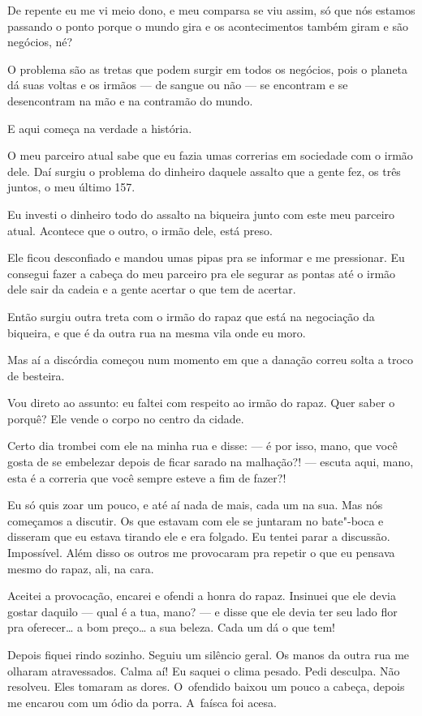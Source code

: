 De repente eu me vi meio dono, e meu comparsa se viu assim, só que nós
estamos passando o ponto porque o mundo gira e os acontecimentos também
giram e são negócios, né?

O problema são as tretas que podem surgir em todos os negócios, pois o
planeta dá suas voltas e os irmãos --- de sangue ou não --- se encontram
e se desencontram na mão e na contramão do mundo.

E aqui começa na verdade a história.

O meu parceiro atual sabe que eu fazia umas correrias em sociedade com o
irmão dele. Daí surgiu o problema do dinheiro daquele assalto que a
gente fez, os três juntos, o meu último 157.

Eu investi o dinheiro todo do assalto na biqueira junto com este meu
parceiro atual. Acontece que o outro, o irmão dele, está preso.

Ele ficou desconfiado e mandou umas pipas pra se informar e me
pressionar. Eu consegui fazer a cabeça do meu parceiro pra ele segurar
as pontas até o irmão dele sair da cadeia e a gente acertar o que tem de
acertar.

Então surgiu outra treta com o irmão do rapaz que está na negociação da
biqueira, e que é da outra rua na mesma vila onde eu moro.

Mas aí a discórdia começou num momento em que a danação correu solta a
troco de besteira.

Vou direto ao assunto: eu faltei com respeito ao irmão do rapaz. Quer
saber o porquê? Ele vende o corpo no centro da cidade.

Certo dia trombei com ele na minha rua e disse: --- é por isso, mano,
que você gosta de se embelezar depois de ficar sarado na malhação?! ---
escuta aqui, mano, esta é a correria que você sempre esteve a fim de
fazer?!

Eu só quis zoar um pouco, e até aí nada de mais, cada um na sua. Mas nós
começamos a discutir. Os que estavam com ele se juntaram no bate"-boca e
disseram que eu estava tirando ele e era folgado. Eu tentei parar a
discussão. Impossível. Além disso os outros me provocaram pra repetir o
que eu pensava mesmo do rapaz, ali, na cara.

Aceitei a provocação, encarei e ofendi a honra do rapaz. Insinuei que
ele devia gostar daquilo --- qual é a tua, mano? --- e disse que ele
devia ter seu lado flor pra oferecer… a bom preço… a sua
beleza. Cada um dá o que tem!

Depois fiquei rindo sozinho. Seguiu um silêncio geral. Os manos da outra
rua me olharam atravessados. Calma aí! Eu saquei o clima pesado. Pedi
desculpa. Não resolveu. Eles tomaram as dores. O~ofendido baixou um
pouco a cabeça, depois me encarou com um ódio da porra. A~faísca foi
acesa.

